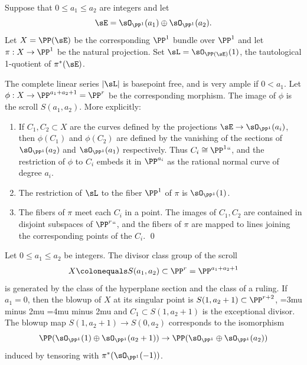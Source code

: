 \begin{npt}
\begin{theorem}
Suppose that $0\leq a_1\leq a_2$ are integers and let
$$
\sE = \sO_{\PP^1}(a_1) \oplus \sO_{\PP^1}(a_2).
$$
Let $X = \PP(\sE)$  be the corresponding $\PP^1$ bundle over $\PP^1$
and let $\pi: X \to \PP^1$ be the natural projection. Set $\sL =
\sO_{\PP(\sE)}(1)$, the tautological 1-quotient of $\pi^*(\sE)$.

The 
complete linear series 
$|\sL|$ is basepoint free, and is very ample
%
%
%
if $0<a_1$.
Let $\phi:X\to \PP^{a_1+a_2+1} = \PP^r$ be the corresponding morphism. The
image of $\phi$ is the scroll $S(a_1,a_2)$.
More explicitly:
\begin{enumerate}
\item If $C_1, C_2\subset X$ are the curves defined by the projections
$\sE \to \sO_{\PP^1}(a_i)$, then $\phi(C_1)$ and 
$\phi(C_2)$
are defined by the vanishing
of the sections of $\sO_{\PP^1}(a_2)$ and  $\sO_{\PP^1}(a_1)$
respectively. Thus $C_i \cong \PP^1` `$,
and  the restriction of $\phi$ to $C_i$ embeds it in $\PP^{a_i}$ as the
rational normal curve of degree $a_i$.

\item The restriction of $\sL$ to the fiber $\PP^1$ of $\pi$ is
$\sO_{\PP^1}(1)$.

\item The fibers of $\pi$ meet each $C_i$ in a point. The images of $C_1,
C_2$ are contained in disjoint subspaces of $\PP^r` `$, and the fibers
of $\pi$ are mapped
to lines joining the corresponding points of the $C_i$.
\qed
\end{enumerate}
\end{theorem}

\begin{corollary}
Let $0\leq a_1\leq a_2$ be integers. The divisor class group of the
%
scroll
$$
X\colonequals S(a_1,a_2) \subset \PP^r = \PP^{a_1+a_2+1}
$$
is generated by the class of the hyperplane section and the class
of a ruling. If $a_1 = 0$, then the blowup of $X$ at its singular point
is $S(1, a_2+1)\subset \PP^{r+2}$,
\medmuskip=3mu minus 2mu
\thickmuskip=4mu minus 2mu
and $C_1\subset S(1, a_2+1)$ is the exceptional divisor.  The 
blowup
%
map $S(1, a_2+1) \to S(0,a_2)$ corresponds to the isomorphism
$$
\PP(\sO_{\PP^1}(1) \oplus \sO_{\PP^1}(a_2+1)) \to \PP(\sO_{\PP^1}
\oplus \sO_{\PP^1}(a_2))
$$
induced by tensoring with $\pi^*(\sO_{\PP^1}(-1))$.
\end{corollary}
\end{npt}

